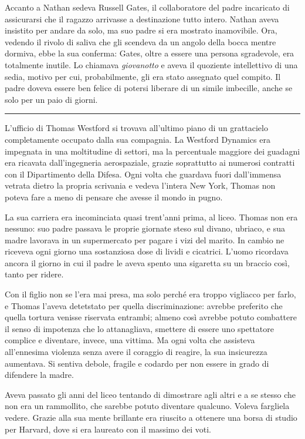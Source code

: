\documentclass[a4paper,oneside,9pt]{memoir}
\begin{document}
Accanto a Nathan sedeva Russell Gates, il collaboratore del padre incaricato di assicurarsi che il ragazzo arrivasse a
destinazione tutto intero. Nathan aveva insistito per andare da solo, ma suo padre si era mostrato inamovibile. Ora,
vedendo il rivolo di saliva che gli scendeva da un angolo della bocca mentre dormiva, ebbe la sua conferma: Gates, oltre
a essere una persona sgradevole, era totalmente inutile. Lo chiamava \emph{giovanotto} e aveva il quoziente intellettivo
di una sedia, motivo per cui, probabilmente, gli era stato assegnato quel compito. Il padre doveva essere ben felice di
potersi liberare di un simile imbecille, anche se solo per un paio di giorni.

\plainbreak{1}

L'ufficio di Thomas Westford si trovava all'ultimo piano di un grattacielo completamente occupato dalla sua compagnia.
La Westford Dynamics era impegnata in una moltitudine di settori, ma la percentuale maggiore dei guadagni era ricavata
dall'ingegneria aerospaziale, grazie soprattutto ai numerosi contratti con il Dipartimento della Difesa. Ogni volta che
guardava fuori dall'immensa vetrata dietro la propria scrivania e vedeva l'intera New York, Thomas non poteva fare a
meno di pensare che avesse il mondo in pugno.

La sua carriera era incominciata quasi trent'anni prima, al liceo. Thomas non era nessuno: suo padre passava le proprie
giornate steso sul divano, ubriaco, e sua madre lavorava in un supermercato per pagare i vizi del marito. In cambio ne
riceveva ogni giorno una sostanziosa dose di lividi e cicatrici. L'uomo ricordava ancora il giorno in cui il padre le
aveva spento una sigaretta su un braccio così, tanto per ridere.

Con il figlio non se l'era mai presa, ma solo perché era troppo vigliacco per farlo, e Thomas l'aveva detetstato per
quella discriminazione: avrebbe preferito che quella tortura venisse riservata entrambi; almeno così avrebbe potuto
combattere il senso di impotenza che lo attanagliava, smettere di essere uno spettatore complice e diventare, invece,
una vittima. Ma ogni volta che assisteva all'ennesima violenza senza avere il coraggio di reagire, la sua insicurezza
aumentava. Si sentiva debole, fragile e codardo per non essere in grado di difendere la madre.

Aveva passato gli anni del liceo tentando di dimostrare agli altri e a se stesso che non era un rammollito, che sarebbe
potuto diventare qualcuno. Voleva fargliela vedere. Grazie alla sua mente brillante era riuscito a ottenere una borsa di
studio per Harvard, dove si era laureato con il massimo dei voti.
\end{document}
